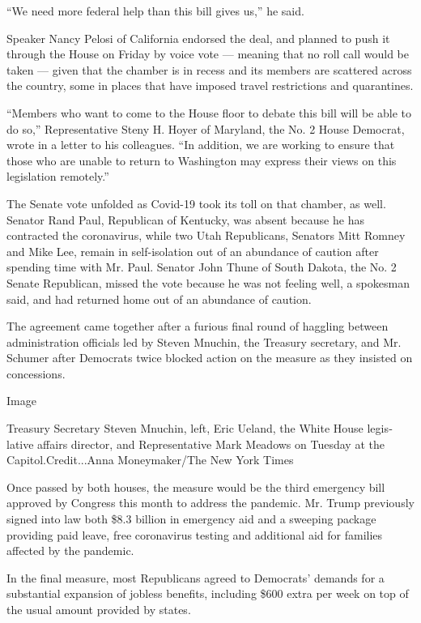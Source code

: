 ``We need more federal help than this bill gives us,'' he said.

Speaker Nancy Pelosi of California endorsed the deal, and planned to
push it through the House on Friday by voice vote --- meaning that no
roll call would be taken --- given that the chamber is in recess and its
members are scattered across the country, some in places that have
imposed travel restrictions and quarantines.

``Members who want to come to the House floor to debate this bill will
be able to do so,'' Representative Steny H. Hoyer of Maryland, the No. 2
House Democrat, wrote in a letter to his colleagues. ``In addition, we
are working to ensure that those who are unable to return to Washington
may express their views on this legislation remotely.''

The Senate vote unfolded as Covid-19 took its toll on that chamber, as
well. Senator Rand Paul, Republican of Kentucky, was absent because he
has contracted the coronavirus, while two Utah Republicans, Senators
Mitt Romney and Mike Lee, remain in self-isolation out of an abundance
of caution after spending time with Mr. Paul. Senator John Thune of
South Dakota, the No. 2 Senate Republican, missed the vote because he
was not feeling well, a spokesman said, and had returned home out of an
abundance of caution.

The agreement came together after a furious final round of haggling
between administration officials led by Steven Mnuchin, the Treasury
secretary, and Mr. Schumer after Democrats twice blocked action on the
measure as they insisted on concessions.

Image

Treasury Secretary Steven Mnuchin, left, Eric Ueland, the White House
legis­lativ­e affai­rs direc­tor, and Representative Mark Meadows on
Tuesday at the Capitol.Credit...Anna Moneymaker/The New York Times

Once passed by both houses, the measure would be the third emergency
bill approved by Congress this month to address the pandemic. Mr. Trump
previously signed into law both \$8.3 billion in emergency aid and a
sweeping package providing paid leave, free coronavirus testing and
additional aid for families affected by the pandemic.

In the final measure, most Republicans agreed to Democrats' demands for
a substantial expansion of jobless benefits, including \$600 extra per
week on top of the usual amount provided by states.

